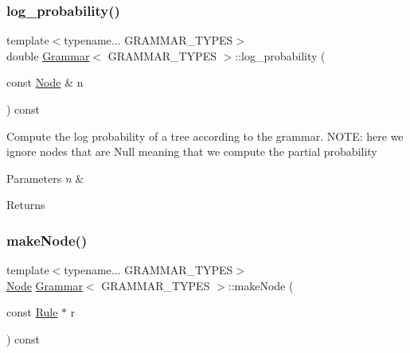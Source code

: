 \mbox{\label{class_grammar_a4b19c0b8d0b4d792181ae47bd2f68268}} 
\subsubsection{\texorpdfstring{log\+\_\+probability()}{log\_probability()}}
{\footnotesize\ttfamily template$<$typename... G\+R\+A\+M\+M\+A\+R\+\_\+\+T\+Y\+P\+ES$>$ \\
double \hyperlink{class_grammar}{Grammar}$<$ G\+R\+A\+M\+M\+A\+R\+\_\+\+T\+Y\+P\+ES $>$\+::log\+\_\+probability (\begin{DoxyParamCaption}\item[{const \hyperlink{class_node}{Node} \&}]{n }\end{DoxyParamCaption}) const\hspace{0.3cm}{\ttfamily [inline]}}

Compute the log probability of a tree according to the grammar. N\+O\+TE\+: here we ignore nodes that are Null meaning that we compute the partial probability 
\begin{DoxyParams}{Parameters}
{\em n} & \\
\hline
\end{DoxyParams}
\begin{DoxyReturn}{Returns}

\end{DoxyReturn}
\mbox{\label{class_grammar_abc6f2a046bdf8df0be45912b5d8fe410}} 
\subsubsection{\texorpdfstring{make\+Node()}{makeNode()}}
{\footnotesize\ttfamily template$<$typename... G\+R\+A\+M\+M\+A\+R\+\_\+\+T\+Y\+P\+ES$>$ \\
\hyperlink{class_node}{Node} \hyperlink{class_grammar}{Grammar}$<$ G\+R\+A\+M\+M\+A\+R\+\_\+\+T\+Y\+P\+ES $>$\+::make\+Node (\begin{DoxyParamCaption}\item[{const \hyperlink{class_rule}{Rule} $\ast$}]{r }\end{DoxyParamCaption}) const\hspace{0.3cm}{\ttfamily [inline]}}

